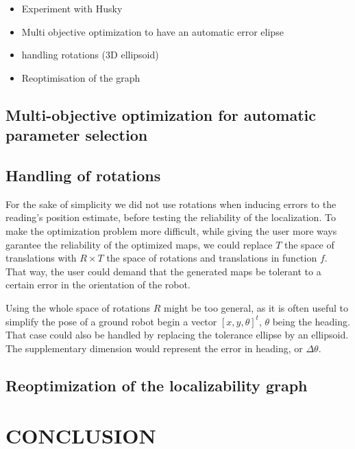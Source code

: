 \documentclass[letterpaper,10 pt,conference]{ieeeconf}
\begin{document}
\begin{itemize}
  \item Experiment with Husky

  \item Multi objective optimization to have an automatic error elipse

  \item handling rotations (3D ellipsoid)

  \item Reoptimisation of the graph

\end{itemize}

\subsection{Multi-objective optimization for automatic parameter selection}

\subsection{Handling of rotations}

For the sake of simplicity we did not use rotations when inducing errors to the reading's
position estimate, before testing the reliability of the localization. To make the optimization
problem more difficult, while giving the user more ways garantee the reliability of the optimized
maps, we could replace $T$ the space of translations with $R \times T$ the space of rotations and
translations in function $f$. That way, the user could demand that the generated maps be tolerant to
a certain error in the orientation of the robot.

Using the whole space of rotations $R$ might be too general, as it is often useful to simplify the pose of a
ground robot begin a vector $[x, y, \theta]^t$, $\theta$ being the heading. That case could also be
handled by replacing the tolerance ellipse by an ellipsoid. The supplementary dimension would
represent the error in heading, or $\Delta \theta$.

\subsection{Reoptimization of the localizability graph}



\section{CONCLUSION}
\end{document}
